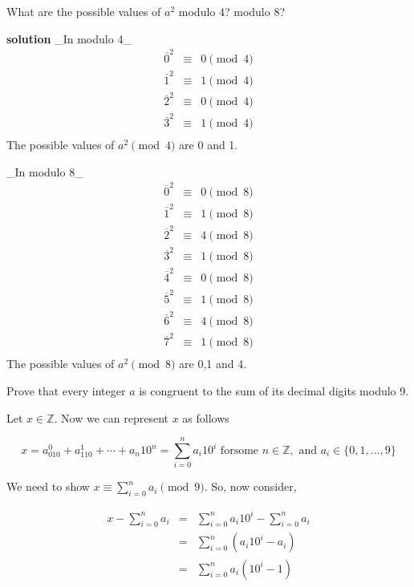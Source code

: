 \documentclass[
]{book}
\begin{document}
\leavevmode{}%
What are the possible values of \(a^2\) modulo 4? modulo 8?

\textbf{solution} \_In modulo 4\_\\
\begin{eqnarray*}
    \overline{0}^2&\equiv & 0 \pmod{4}\\
    \overline{1}^2&\equiv & 1 \pmod{4}\\
    \overline{2}^2&\equiv & 0 \pmod{4}\\
    \overline{3}^2&\equiv & 1 \pmod{4}\\
\end{eqnarray*} The possible values of \(a^2\pmod{4}\) are 0 and 1.

\_In modulo 8\_\\
\begin{eqnarray*}
    \overline{0}^2&\equiv & 0 \pmod{8}\\
    \overline{1}^2&\equiv & 1 \pmod{8}\\
    \overline{2}^2&\equiv & 4 \pmod{8}\\
    \overline{3}^2&\equiv & 1 \pmod{8}\\
    \overline{4}^2&\equiv & 0 \pmod{8}\\
    \overline{5}^2&\equiv & 1 \pmod{8}\\
    \overline{6}^2&\equiv & 4 \pmod{8}\\
    \overline{7}^2&\equiv & 1 \pmod{8}\\
\end{eqnarray*} The possible values of \(a^2\pmod{8}\) are 0,1 and 4.

\leavevmode{}%
Prove that every integer \(a\) is congruent to the sum of its decimal
digits modulo 9.

Let \(x\in \mathbb{Z}\). Now we can represent \(x\) as follows

\[x=a_010^0+a_110^1+\cdots +a_n10^n=\sum_{i=0}^n a_{i}10^i\text{  forsome } n\in \mathbb{Z},\text{ and }a_i\in \{0,1,...,9\}\]

We need to show \(x \equiv \sum_{i=0}^na_i\pmod{9}\). So, now consider,

\begin{eqnarray}
x-\sum_{i=0}^n a_{i}&=&\sum_{i=0}^n a_{i}10^i-\sum_{i=0}^n a_{i}\\
&=& \sum_{i=0}^n (a_{i}10^i- a_{i})\\
&=& \sum_{i=0}^n a_{i}(10^i- 1)
\end{eqnarray}
\end{document}
